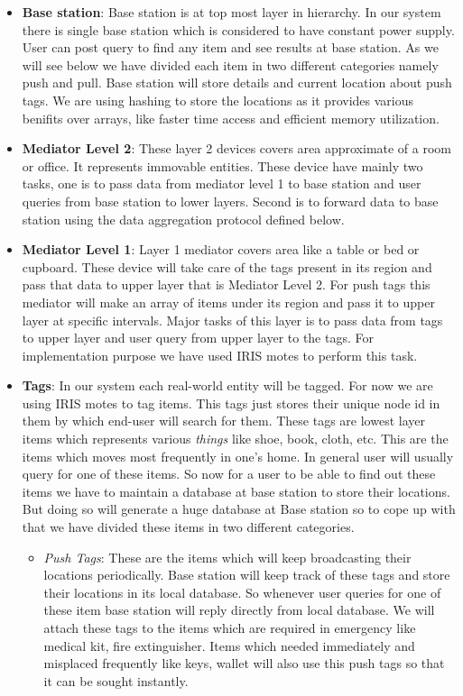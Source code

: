 \documentclass [a4paper,12pt]{book}
\begin{document}
\begin{itemize}

\item \textbf{Base station}: Base station is at top most layer in hierarchy. In our system there is single base station which is considered to have constant power supply. User can post query to find any item and see results at base station. As we will see below we have divided each item in two different categories namely push and pull. Base station will store details and current location about push tags. We are using hashing to store the locations as it provides various benifits over arrays, like faster time access and efficient memory utilization.

\item \textbf{Mediator Level 2}: These layer 2 devices covers area approximate of a room or office. It represents immovable entities. These device have mainly two tasks, one is to pass data from mediator level 1 to base station and user queries from base station to lower layers. Second is to forward data to base station using the data aggregation protocol defined below. 

\item \textbf{Mediator Level 1}: Layer 1 mediator covers area like a table or bed or cupboard. These device will take care of the tags present in its region and pass that data to upper layer that is Mediator Level 2. For push tags this mediator will make an array of items under its region and pass it to upper layer at specific intervals. Major tasks of this layer is to pass data from tags to upper layer and user query from upper layer to the tags. For implementation purpose we have used IRIS motes to perform this task.

\item \textbf{Tags}: In our system each real-world entity will be tagged. For now we are using IRIS motes to tag items. This tags just stores their unique node id in them by which end-user will search for them. These tags are lowest layer items which represents various \emph{things} like shoe, book, cloth, etc. This are the items which moves most frequently in one's home. In general user will usually query for one of these items. So now for a user to be able to find out these items we have to maintain a database at base station to store their locations. But doing so will generate a huge database at Base station so to cope up with that we have divided these items in two different categories.

\begin{itemize}
\item \emph{Push Tags}: These are the items which will keep broadcasting their locations periodically. Base station will keep track of these tags and store their locations in its local database. So whenever user queries for one of these item base station will reply directly from local database. We will attach these tags to the items which are required in emergency like medical kit, fire extinguisher. Items which needed immediately and misplaced frequently like keys, wallet will also use this push tags so that it can be sought instantly.


\end{itemize}
\end{itemize}
\end{document}
